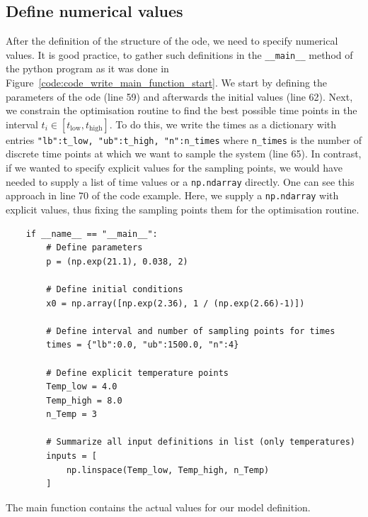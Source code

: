 \documentclass[10pt,A4paper]{article}
\begin{document}
\subsection*{Define numerical values}
After the definition of the structure of the \ac{ode}, we need to specify numerical values.
It is good practice, to gather such definitions in the \texttt{__main__} method of the python program as it was done in Figure~\ref{code:code_write_main_function_start}.
We start by defining the parameters of the \ac{ode} (line 59) and afterwards the initial values (line 62).
Next, we constrain the optimisation routine to find the best possible time points in the interval $t_i\in\left[t_\text{low},t_\text{high}\right]$.
To do this, we write the times as a dictionary with entries \texttt{{"lb":t_low, "ub":t_high, "n":n_times}} where \texttt{n_times} is the number of discrete time points at which we want to sample the system (line 65).
In contrast, if we wanted to specify explicit values for the sampling points, we would have needed to supply a list of time values or a \texttt{np.ndarray} directly.
One can see this approach  in line 70 of the code example.
Here, we supply a \texttt{np.ndarray} with explicit values, thus fixing the sampling points them for the optimisation routine.
\begin{code}[h]
    \begin{verbatim}
    if __name__ == "__main__":
        # Define parameters
        p = (np.exp(21.1), 0.038, 2)

        # Define initial conditions
        x0 = np.array([np.exp(2.36), 1 / (np.exp(2.66)-1)])

        # Define interval and number of sampling points for times
        times = {"lb":0.0, "ub":1500.0, "n":4}

        # Define explicit temperature points
        Temp_low = 4.0
        Temp_high = 8.0
        n_Temp = 3

        # Summarize all input definitions in list (only temperatures)
        inputs = [
            np.linspace(Temp_low, Temp_high, n_Temp)
        ]
    \end{verbatim}
    \caption{The main function contains the actual values for our model definition.}
    \label{code:code_write_main_function_start}
\end{code}
\end{document}
